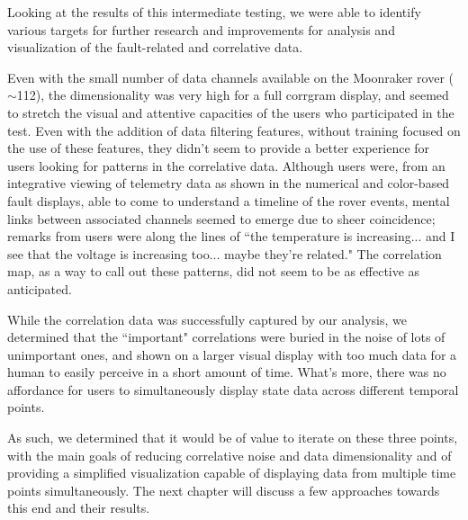 Looking at the results of this intermediate testing, we were able to identify various targets for further research and improvements for analysis and visualization of the fault-related and correlative data.

Even with the small number of data channels available on the Moonraker rover ($\sim$112), the dimensionality was very high for a full corrgram display, and seemed to stretch the visual and attentive capacities of the users who participated in the test. Even with the addition of data filtering features, without training focused on the use of these features, they didn't seem to provide a better experience for users looking for patterns in the correlative data. Although users were, from an integrative viewing of telemetry data as shown in the numerical and color-based fault displays, able to come to understand a timeline of the rover events, mental links between associated channels seemed to emerge due to sheer coincidence; remarks from users were along the lines of ``the temperature is increasing... and I see that the voltage is increasing too... maybe they're related." The correlation map, as a way to call out these patterns, did not seem to be as effective as anticipated.

While the correlation data was successfully captured by our analysis, we determined that the ``important" correlations were buried in the noise of lots of unimportant ones, and shown on a larger visual display with too much data for a human to easily perceive in a short amount of time. What's more, there was no affordance for users to simultaneously display state data across different temporal points.

As such, we determined that it would be of value to iterate on these three points, with the main goals of reducing correlative noise and data dimensionality and of providing a simplified visualization capable of displaying data from multiple time points simultaneously. The next chapter will discuss a few approaches towards this end and their results.